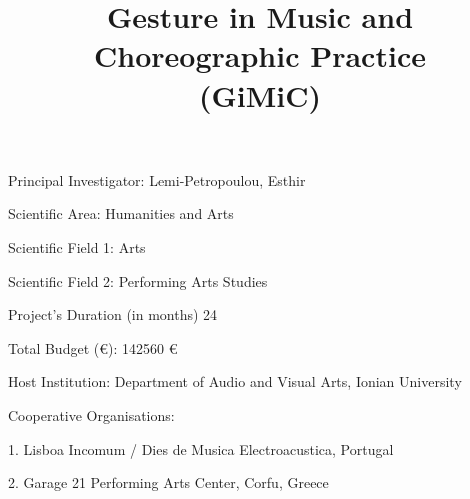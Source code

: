 \documentclass[a4paper,11pt]{article}
\title{ \begin{huge}
    \textbf{Gesture in Music and Choreographic Practice\\ }
    \textbf{(GiMiC)} 
  \end{huge}
}
\date{}
\begin{document}
\maketitle

\vspace{3cm}

\indent
Principal Investigator: Lemi-Petropoulou, Esthir

\vspace{0.1cm}

Scientific Area: Humanities and Arts

\vspace{0.1cm}

Scientific Field 1: Arts

\vspace{0.1cm}

Scientific Field 2: Performing Arts Studies

\vspace{0.1cm}

Project’s Duration (in months) 24

\vspace{0.1cm}

Total Budget (\euro): 142560 \euro

\vspace{0.1cm}

Host Institution: Department of Audio and Visual Arts, Ionian University 

\vspace{1cm}

Cooperative Organisations:

\vspace{0.2cm}

1. Lisboa Incomum / Dies de Musica Electroacustica, Portugal

\vspace{0.1cm}

2. Garage 21 Performing Arts Center, Corfu, Greece

\newpage


\end{document}
